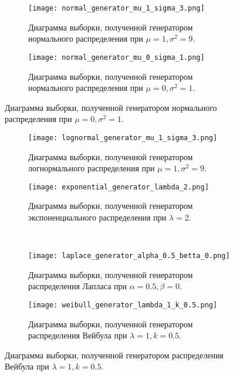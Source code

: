 \begin{figure}[!h]
	\centering
	\begin{subfigure}[b]{0.45\textwidth}
		\texttt{[image: normal\_generator\_mu\_1\_sigma\_3.png]}
		\caption{Диаграмма выборки, полученной генератором нормального распределения при $\mu = 1, \sigma^{2} = 9$.}
	\end{subfigure}
	\hfill
	\begin{subfigure}[b]{0.45\textwidth}
		\texttt{[image: normal\_generator\_mu\_0\_sigma\_1.png]}
		\caption{Диаграмма выборки, полученной генератором нормального распределения при $\mu = 0, \sigma^{2} = 1$.}
	\end{subfigure}

\end{figure}
\begin{figure}[H]
	\centering
	\begin{subfigure}[b]{0.45\textwidth}
		\texttt{[image: lognormal\_generator\_mu\_1\_sigma\_3.png]}
		\caption{Диаграмма выборки, полученной генератором логнормального распределения при $\mu = 1, \sigma^{2} = 9$.}
	\end{subfigure}
	\hfill
	\begin{subfigure}[b]{0.45\textwidth}
		\texttt{[image: exponential\_generator\_lambda\_2.png]}
		\caption{Диаграмма выборки, полученной генератором экспоненциального распределения при $\lambda = 2$.}
	\end{subfigure}
	\\
	\begin{subfigure}[b]{0.45\textwidth}
		\texttt{[image: laplace\_generator\_alpha\_0.5\_betta\_0.png]}
		\caption{Диаграмма выборки, полученной генератором распределения Лапласа при $\alpha = 0.5, \beta = 0$.}
	\end{subfigure}
	\hfill
	\begin{subfigure}[b]{0.45\textwidth}
		\texttt{[image: weibull\_generator\_lambda\_1\_k\_0.5.png]}
		\caption{Диаграмма выборки, полученной генератором распределения Вейбула при $\lambda = 1, k = 0.5$.}
	\end{subfigure}
\end{figure}
